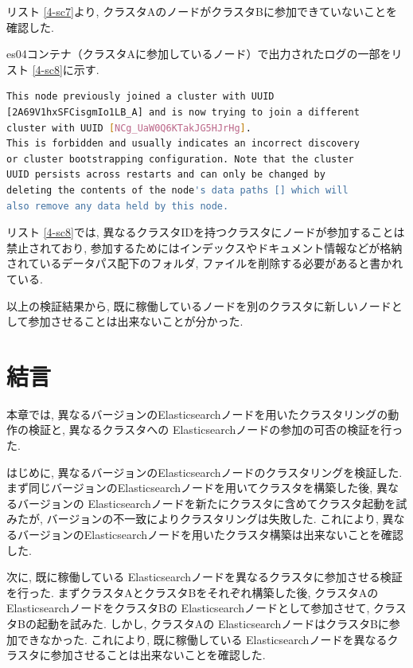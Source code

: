 リスト \ref{4-sc7}より, クラスタAのノードがクラスタBに参加できていないことを確認した.

es04コンテナ（クラスタAに参加しているノード）で出力されたログの一部をリスト \ref{4-sc8}に示す.

\begin{lstlisting}[language=bash, caption=es04コンテナのログの一部, label=4-sc8]
This node previously joined a cluster with UUID
[2A69V1hxSFCisgmIo1LB_A] and is now trying to join a different
cluster with UUID [NCg_UaW0Q6KTakJG5HJrHg].
This is forbidden and usually indicates an incorrect discovery
or cluster bootstrapping configuration. Note that the cluster
UUID persists across restarts and can only be changed by
deleting the contents of the node's data paths [] which will
also remove any data held by this node.
\end{lstlisting}

リスト \ref{4-sc8}では, 異なるクラスタIDを持つクラスタにノードが参加することは禁止されており, 参加するためにはインデックスやドキュメント情報などが格納されているデータパス配下のフォルダ, ファイルを削除する必要があると書かれている.

以上の検証結果から, 既に稼働しているノードを別のクラスタに新しいノードとして参加させることは出来ないことが分かった.

\section{結言}
本章では, 異なるバージョンのElasticsearchノードを用いたクラスタリングの動作の検証と, 異なるクラスタへの Elasticsearchノードの参加の可否の検証を行った.

はじめに, 異なるバージョンのElasticsearchノードのクラスタリングを検証した. まず同じバージョンのElasticsearchノードを用いてクラスタを構築した後, 異なるバージョンの Elasticsearchノードを新たにクラスタに含めてクラスタ起動を試みたが, バージョンの不一致によりクラスタリングは失敗した. これにより, 異なるバージョンのElasticsearchノードを用いたクラスタ構築は出来ないことを確認した.

次に, 既に稼働している Elasticsearchノードを異なるクラスタに参加させる検証を行った. まずクラスタAとクラスタBをそれぞれ構築した後, クラスタAの ElasticsearchノードをクラスタBの Elasticsearchノードとして参加させて, クラスタBの起動を試みた. しかし, クラスタAの ElasticsearchノードはクラスタBに参加できなかった. これにより, 既に稼働している Elasticsearchノードを異なるクラスタに参加させることは出来ないことを確認した.


